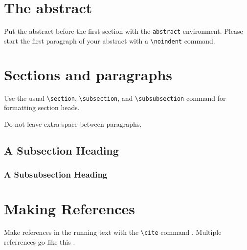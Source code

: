 \documentclass{article}
\begin{document}
\section{The abstract}

Put the abstract before the first section with the \verb+abstract+
environment. Please start the first paragraph of your abstract with a \verb+\noindent+ command.


\section{Sections and paragraphs}

  Use the usual \verb+\section+, \verb+\subsection+, and
  \verb+\subsubsection+ command for formatting section heads.

  Do not leave extra space between paragraphs.


  \subsection{A Subsection Heading}


  \subsubsection{A Subsubsection Heading}


  \section{Making References}

  Make references in the running text with the \verb+\cite+
  command \cite{dijkstra68}. Multiple referrences go like this
  \cite{charniak85,steels98}.




\end{document}
